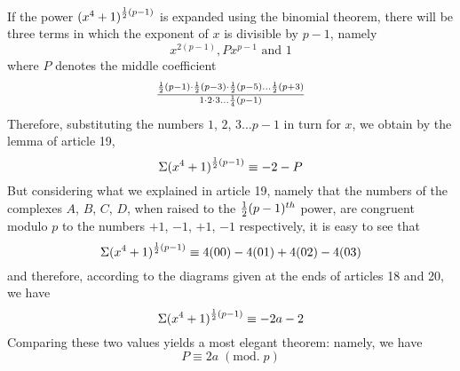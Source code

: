 \documentclass[twoside,12pt]{memoir}
\renewcommand{\pmod}[1]{\;(\textrm{mod.}\;#1)}
\let\oldfrac\frac
\def\frac#1#2{\mathchoice{\tfrac{#1}{#2}}{\oldfrac{#1}{#2}}{\genfrac{}{}{}{2}{#1}{#2\mathstrut}}{\genfrac{}{}{}{3}{#1}{#2\mathstrut}}}
\begin{document}
If the power \((x^{4}+1)^{\frac{1}{2}(p-1)}\) is expanded using the binomial theorem, there will be three terms in which the exponent of \(x\) is divisible by \(p-1\), namely
\[x^{2(p-1)}, P x^{p-1} \text{ and } 1\]\pagebreak%
where \(P\) denotes the middle coefficient
\[\frac{\frac{1}{2}(p-1) \cdot \frac{1}{2}(p-3) \cdot \frac{1}{2}(p-5) \ldots \frac{1}{2}(p+3)}{1 \cdot 2 \cdot 3 \ldots \frac{1}{4}(p-1)}\]
Therefore, substituting the numbers \(1\), \(2\), \(3 \ldots p-1\) in turn for \(x\), we obtain by the lemma of article 19,
\[\Sigma(x^{4}+1)^{\frac{1}{2}(p-1)} \equiv-2-P\]
But considering what we explained in article 19, namely that the numbers of the complexes \(A\), \(B\), \(C\), \(D\), when raised to the \(\frac{1}{2}(p-1)^{th}\) power, are congruent modulo \(p\) to the numbers \(+1\), \(-1\), \(+1\), \(-1\) respectively, it is easy to see that
\[\Sigma(x^{4}+1)^{\frac{1}{2}(p-1)} \equiv 4(00)-4(01)+4(02)-4(03)\]
and therefore, according to the diagrams given at the ends of articles 18 and 20, we have
\[\Sigma(x^{4}+1)^{\frac{1}{2}(p-1)} \equiv-2 a-2\]
Comparing these two values yields a most elegant theorem: namely, we have
\[P \equiv 2 a\pmod{p}\]
\end{document}
